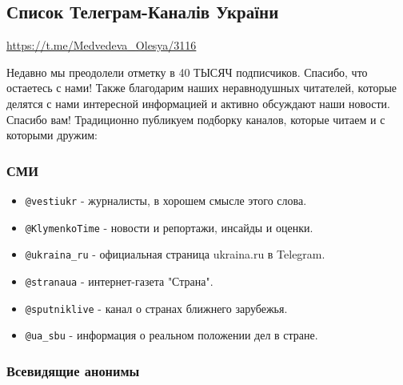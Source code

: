  
 
 

\subsection{Список Телеграм-Каналів України}

\url{https://t.me/Medvedeva_Olesya/3116}

Недавно мы преодолели отметку в 40 ТЫСЯЧ подписчиков. Спасибо, что остаетесь с
нами! Также благодарим наших неравнодушных читателей, которые делятся с нами
интересной информацией и активно обсуждают наши новости. Спасибо вам!
Традиционно публикуем подборку каналов, которые читаем и с которыми дружим:

\subsubsection{СМИ}

\begin{itemize}
\item \verb|@vestiukr| - журналисты, в хорошем смысле этого слова.
\item \verb|@KlymenkoTime| - новости и репортажи, инсайды и оценки.
\item \verb|@ukraina_ru| - официальная страница ukraina.ru в Telegram.
\item \verb|@stranaua| -  интернет-газета "Страна".
\item \verb|@sputniklive| - канал о странах ближнего зарубежья. 
\item \verb|@ua_sbu| - информация о реальном положении дел в стране.
\end{itemize}

\subsubsection{Всевидящие анонимы}


